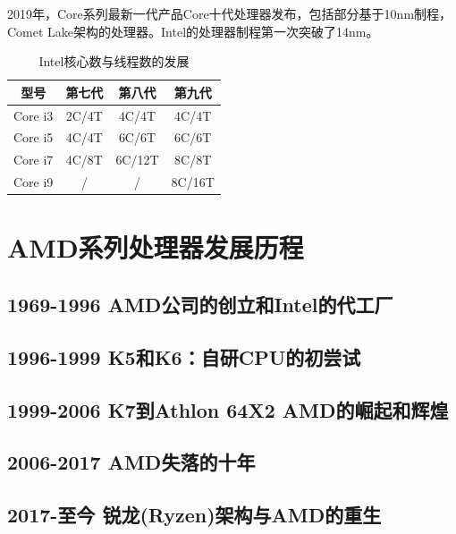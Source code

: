 \documentclass[UTF8]{ctexart}
\begin{document}
2019年，Core系列最新一代产品Core十代处理器发布，包括部分基于10nm制程，Comet Lake架构的处理器。Intel的处理器制程第一次突破了14nm。
\begin{table}[H]
    \centering
    \caption{Intel核心数与线程数的发展}
    \begin{tabular}{cccc}
        \toprule
        型号    & 第七代 & 第八代 & 第九代 \\
        \midrule
        Core i3 & 2C/4T  & 4C/4T  & 4C/4T  \\
        Core i5 & 4C/4T  & 6C/6T  & 6C/6T  \\
        Core i7 & 4C/8T  & 6C/12T & 8C/8T  \\
        Core i9 & /      & /      & 8C/16T\\
        \bottomrule
    \end{tabular}
\end{table}
\newpage






\section{AMD系列处理器发展历程}
\subsection{1969-1996 AMD公司的创立和Intel的代工厂}
\subsection{1996-1999 K5和K6：自研CPU的初尝试}
\subsection{1999-2006 K7到Athlon 64X2 AMD的崛起和辉煌}
\subsection{2006-2017 AMD失落的十年}
\subsection{2017-至今 锐龙(Ryzen)架构与AMD的重生}
\end{document}
